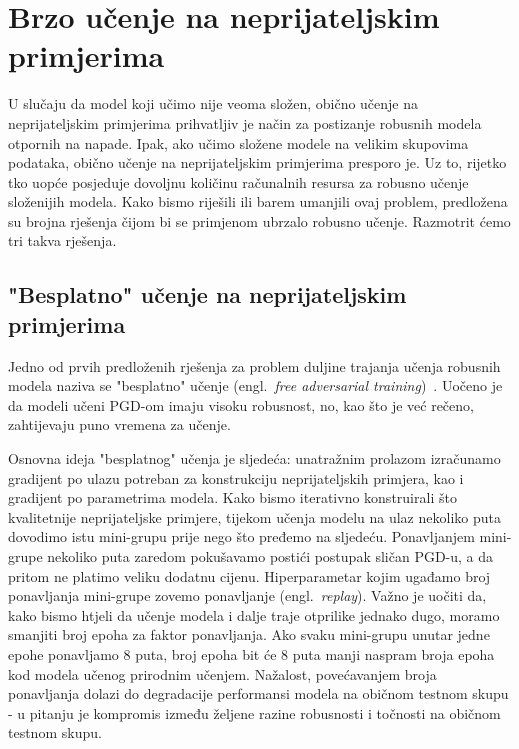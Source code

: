 \documentclass[times, utf8, zavrsni, numeric]{fer}
\begin{document}
\section{Brzo učenje na neprijateljskim primjerima}

U slučaju da model koji učimo nije veoma složen, obično učenje na neprijateljskim primjerima prihvatljiv je način za postizanje robusnih modela otpornih na napade.
Ipak, ako učimo složene modele na velikim skupovima podataka, obično učenje na neprijateljskim primjerima presporo je. 
Uz to, rijetko tko uopće posjeduje dovoljnu količinu računalnih resursa za robusno učenje složenijih modela.
Kako bismo riješili ili barem umanjili ovaj problem, predložena su brojna rješenja čijom bi se primjenom ubrzalo robusno učenje. Razmotrit ćemo tri takva rješenja.

\subsection{"Besplatno" učenje na neprijateljskim primjerima}

Jedno od prvih predloženih rješenja za problem duljine trajanja učenja robusnih modela naziva se "besplatno" učenje (engl.\ \textit{free adversarial training})~\cite{shafahi2019adversarial}.
Uočeno je da modeli učeni PGD-om imaju visoku robusnost, no, kao što je već rečeno, zahtijevaju puno vremena za učenje.

Osnovna ideja "besplatnog" učenja je sljedeća: unatražnim prolazom izračunamo gradijent po ulazu potreban za konstrukciju neprijateljskih primjera, kao i gradijent po parametrima modela.
Kako bismo iterativno konstruirali što kvalitetnije neprijateljske primjere, tijekom učenja modelu na ulaz nekoliko puta dovodimo istu mini-grupu prije nego što pređemo na sljedeću.
Ponavljanjem mini-grupe nekoliko puta zaredom pokušavamo postići postupak sličan PGD-u, a da pritom ne platimo veliku dodatnu cijenu. 
Hiperparametar kojim ugađamo broj ponavljanja mini-grupe zovemo ponavljanje (engl.\ \textit{replay}).
Važno je uočiti da, kako bismo htjeli da učenje modela i dalje traje otprilike jednako dugo, moramo smanjiti broj epoha za faktor ponavljanja. 
Ako svaku mini-grupu unutar jedne epohe ponavljamo 8 puta, broj epoha bit će 8 puta manji naspram broja epoha kod modela učenog prirodnim učenjem.
Nažalost, povećavanjem broja ponavljanja dolazi do degradacije performansi modela na običnom testnom skupu - u pitanju je kompromis između željene razine robusnosti i točnosti na običnom testnom skupu.
\end{document}
